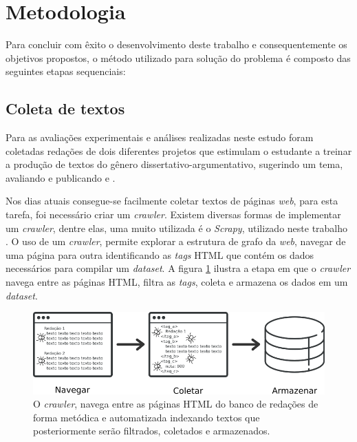 \section{Metodologia}

Para concluir com êxito o desenvolvimento deste trabalho e consequentemente os 
objetivos propostos, o método utilizado para solução do problema é composto das 
seguintes etapas sequenciais:

\subsection{Coleta de textos}
\label{subsection:coleta_texto}

Para as avaliações experimentais e análises realizadas neste estudo foram 
coletadas redações de dois diferentes projetos que estimulam o estudante a 
treinar a produção de textos do gênero dissertativo-argumentativo, sugerindo 
um tema, avaliando e publicando \cite{brasil_escola} e \cite{uol:2017}. 

Nos dias atuais consegue-se facilmente coletar textos de páginas \textit{web}, 
para esta tarefa, foi necessário criar um \textit{crawler}. Existem diversas 
formas de implementar um \textit{crawler}, dentre elas, uma muito utilizada é o 
\textit{Scrapy}, utilizado neste trabalho \cite{scrapy}. O uso de um 
\textit{crawler}, permite explorar a estrutura de grafo da \textit{web}, 
navegar de uma página para outra identificando as \textit{tags} HTML que contém 
os dados necessários para compilar um \textit{dataset}. A figura 
\ref{figure:metodologia_1} ilustra a etapa em que o \textit{crawler} navega 
entre as páginas HTML, filtra as \textit{tags}, coleta e armazena os dados em 
um \textit{dataset}.

\begin{figure}[H]
\begin{center}
    \includegraphics[scale=0.70]{images/metodologia_1.png}
\end{center}
\caption{O \textit{crawler}, navega entre as páginas HTML do banco de redações 
de forma metódica e automatizada indexando textos que posteriormente serão 
filtrados, coletados e armazenados.}
\label{figure:metodologia_1}
\end{figure}

